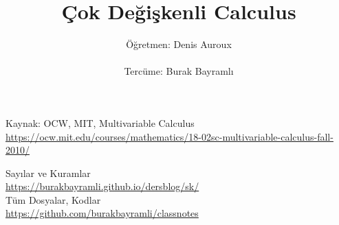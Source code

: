 \documentclass[12pt,a4paper]{report}
\title{Çok Değişkenli Calculus}
\author{Öğretmen: Denis Auroux \\ \\ Tercüme: Burak Bayramlı}
\date{}
\begin{document}
\maketitle

\newpage


\begin{figure}[!hbp]
\end{figure}

\begin{center}

\vspace*{3cm}
Kaynak: OCW, MIT, Multivariable Calculus\\
\vspace{0.5cm}
\url{https://ocw.mit.edu/courses/mathematics/18-02sc-multivariable-calculus-fall-2010/} %
\vspace{0.5cm}

Sayılar ve Kuramlar\\
\vspace{0.5cm}
\url{https://burakbayramli.github.io/dersblog/sk/}\\
\vspace{0.5cm}
Tüm Dosyalar, Kodlar\\
\vspace{0.5cm}
\url{https://github.com/burakbayramli/classnotes}\\
\end{center}
\end{document}
